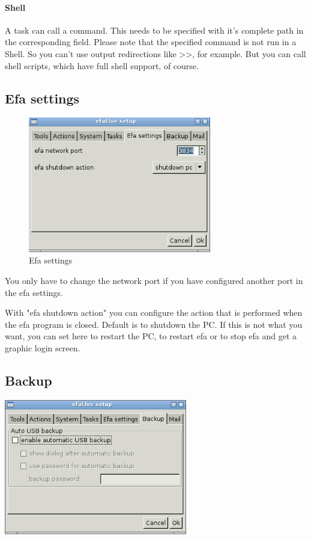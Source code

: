 \documentclass[a4paper,12pt,twoside]{article}
\begin{document}
\paragraph{Shell}
A task can call a command. This needs to be specified with it's complete path
in the corresponding field. Please note that the specified command is not run
in a Shell. So you can't use output redirections like >>, for example. But you 
can call shell scripts, which have full shell support, of course.


\subsection{Efa settings}
\label{sct:efalivesetup_settings}

\begin{figure}
    \centering
    \includegraphics[width=8cm]{screenshots/efalive_setup_efa-settings.png}
    \caption{Efa settings}
    \label{fig:efalivesetup_efasettings}
\end{figure}

You only have to change the network port
if you have configured another port in the efa settings.

With "efa shutdown action" you can configure
the action that is performed when the efa program is closed. Default is
to shutdown the PC. If this is not what you want, you can set here to
restart the PC, to restart efa or to stop efa and get a graphic login 
screen.


\subsection{Backup}
\label{sct:efalivesetup_backup}

\bigskip
\begin{minipage}{\linewidth}
    \centering
    \captionsetup{type=figure}
    \includegraphics[width=8cm]{screenshots/efalive_setup_backup.png}
    \label{fig:efalivesetup_backup}
\end{minipage}
\bigskip
\end{document}
